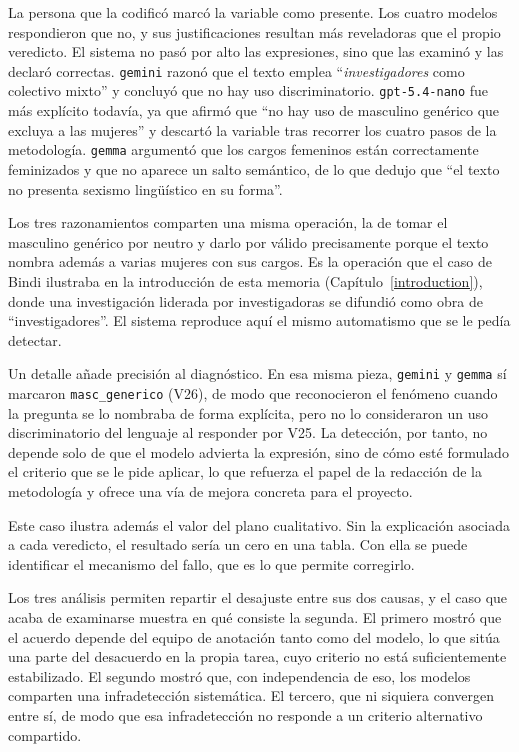 La persona que la codificó marcó la variable como presente. Los cuatro modelos respondieron
que no, y sus justificaciones resultan más reveladoras que el propio veredicto. El
sistema no pasó por alto las expresiones, sino que las examinó y las declaró
correctas. \texttt{gemini} razonó que el texto emplea
``\textit{investigadores} como colectivo mixto'' y concluyó que no hay uso
discriminatorio. \texttt{gpt-5.4-nano} fue más explícito todavía, ya que afirmó que
``no hay uso de masculino genérico que excluya a las mujeres'' y descartó la
variable tras recorrer los cuatro pasos de la metodología. \texttt{gemma}
argumentó que los cargos femeninos están correctamente feminizados y que no
aparece un salto semántico, de lo que dedujo que ``el texto no presenta sexismo
lingüístico en su forma''.

Los tres razonamientos comparten una misma operación, la de tomar el masculino
genérico por neutro y darlo por válido precisamente porque el texto nombra además a
varias mujeres con sus cargos. Es la operación que el caso de Bindi ilustraba en la
introducción de esta memoria (Capítulo~\ref{introduction}), donde una investigación
liderada por investigadoras se difundió como obra de ``investigadores''. El sistema
reproduce aquí el mismo automatismo que se le pedía detectar.

Un detalle añade precisión al diagnóstico. En esa misma pieza,
\texttt{gemini} y \texttt{gemma} sí marcaron
\texttt{masc\_generico} (V26), de modo que reconocieron el fenómeno cuando la
pregunta se lo nombraba de forma explícita, pero no lo consideraron un uso
discriminatorio del lenguaje al responder por V25. La detección, por tanto, no
depende solo de que el modelo advierta la expresión, sino de cómo esté formulado el
criterio que se le pide aplicar, lo que refuerza el papel de la redacción de la
metodología y ofrece una vía de mejora concreta para el proyecto.

Este caso ilustra además el valor del plano cualitativo. Sin la explicación
asociada a cada veredicto, el resultado sería un cero en una tabla. Con ella se
puede identificar el mecanismo del fallo, que es lo que permite corregirlo.

Los tres análisis permiten repartir el desajuste entre sus dos causas, y el caso que
acaba de examinarse muestra en qué consiste la segunda. El primero
mostró que el acuerdo depende del equipo de anotación tanto como del modelo, lo que
sitúa una parte del desacuerdo en la propia tarea, cuyo criterio no está
suficientemente estabilizado. El segundo mostró que, con independencia de eso, los
modelos comparten una infradetección sistemática. El tercero, que ni siquiera
convergen entre sí, de modo que esa infradetección no responde a un criterio
alternativo compartido.

